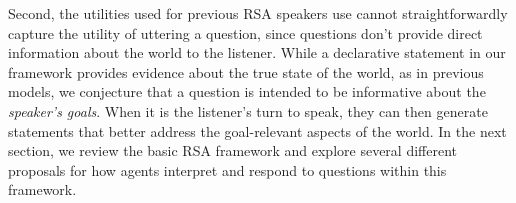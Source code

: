 \documentclass[11pt, floatsintext]{apa6}
\begin{document}
Second, the utilities used for previous RSA speakers use cannot straightforwardly capture the utility of uttering a question, since questions don't provide direct information about the world to the listener.
While a declarative statement in our framework provides evidence about the true state of the world, as in previous models, we conjecture that a question is intended to be informative about the \emph{speaker's goals}. 
When it is the listener's turn to speak, they can then generate statements that better address the goal-relevant aspects of the world. 
In the next section, we review the basic RSA framework and explore several different proposals for how agents interpret and respond to questions within this framework.



\end{document}
